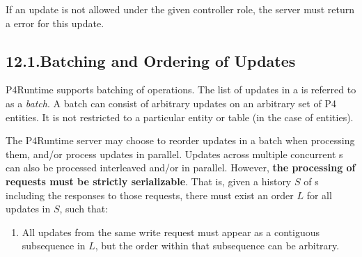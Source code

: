 \documentclass[11pt]{article}
\begin{document}
{%
\noindent{}If an update is not allowed under the given controller role, the server must
return a  error for this update.%

\subsection{12.1.\hspace*{0.5em}Batching and Ordering of Updates}\label{sec-batching-and-ordering-of-updates}%

\noindent{}P4Runtime supports batching of  operations. The list of updates in a
 is referred to as a \emph{batch}. A batch can consist of arbitrary
updates on an arbitrary set of P4 entities. It is not restricted to a particular
entity or table (in the case of  entities).%

The P4Runtime server may choose to reorder updates in a batch when processing
them, and/or process updates in parallel.  Updates across multiple concurrent
s can also be processed interleaved and/or in parallel.
However, \textbf{the processing of requests must be strictly serializable}.  That
is, given a history $S$ of s including the responses to those
requests, there must exist an order $L$ for all updates in $S$, such that:%

\begin{enumerate}[noitemsep,topsep=\mdcompacttopsep]%

\item{}All updates from the same write request must appear as a contiguous
subsequence in $L$, but the order within that subsequence can be arbitrary.%


\end{enumerate}}
\end{document}
